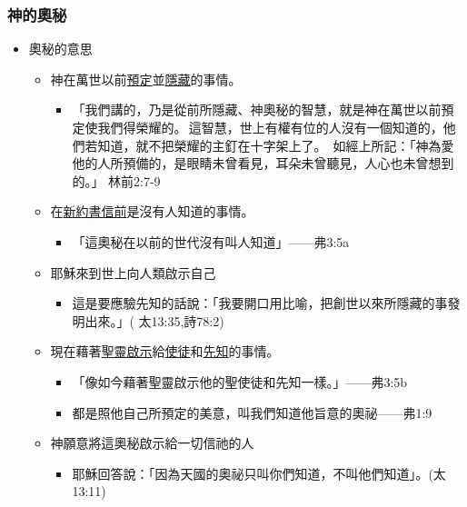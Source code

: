 \subsubsection{神的奧秘}
\begin{itemize}
\itemsep-.25em 
\item 奧秘的意思 
\begin{itemize}
\itemsep-.25em 

\item 神在萬世以前\underline{預定}並\underline{隱藏}的事情。
\begin{itemize}
\itemsep-.25em 
\item 「我們講的，乃是從前所隱藏、神奧秘的智慧，就是神在萬世以前預定使我們得榮耀的。 這智慧，世上有權有位的人沒有一個知道的，他們若知道，就不把榮耀的主釘在十字架上了。  如經上所記：「神為愛他的人所預備的，是眼睛未曾看見，耳朵未曾聽見，人心也未曾想到的。」 林前2:7-9
\end{itemize} 

\item 在\underline{新約書信前}是沒有人知道的事情。
\begin{itemize}
\itemsep-.25em
\item 「這奧秘在以前的世代沒有叫人知道」——弗3:5a
\end{itemize}
\item 耶穌來到世上向人類啟示自己
\begin{itemize}
\itemsep-.25em
\item 這是要應驗先知的話說：「我要開口用比喻，把創世以來所隱藏的事發明出來。」( 太13:35,詩78:2)
\end{itemize} 
\item 現在藉著\underline{聖靈啟示}給\underline{使徒}和\underline{先知}的事情。
\begin{itemize}
\itemsep-.25em 
\item 「像如今藉著聖靈啟示他的聖使徒和先知一樣。」——弗3:5b 
\item 都是照他自己所預定的美意，叫我們知道他旨意的奧祕——弗1:9
\end{itemize}
 
\item 神願意將這奧秘啟示給一切信祂的人
\begin{itemize}
\itemsep-.25em
\item 耶穌回答說：「因為天國的奧祕只叫你們知道，不叫他們知道」。(太13:11)

\end{itemize}

\end{itemize}


\end{itemize}
